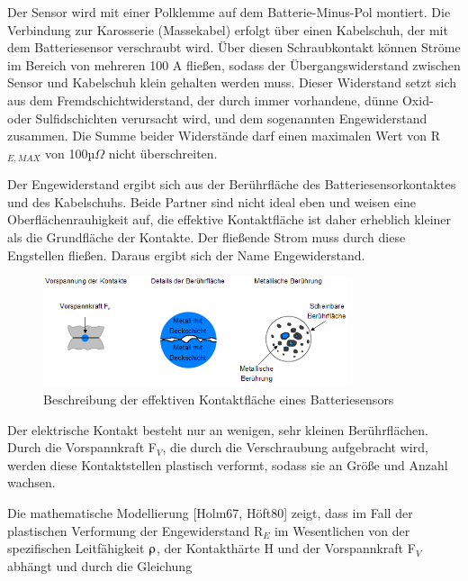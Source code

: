 \noindent Der Sensor wird mit einer Polklemme auf dem Batterie-Minus-Pol montiert. Die Verbindung zur Karosserie (Massekabel) erfolgt \"{u}ber einen Kabelschuh, der mit dem Batteriesensor verschraubt wird. \"{U}ber diesen Schraubkontakt k\"{o}nnen Str\"{o}me im Bereich von mehreren 100 A flie{\ss}en, sodass der \"{U}bergangswiderstand zwischen Sensor und Kabelschuh klein gehalten werden muss. Dieser Widerstand setzt sich aus dem Fremdschichtwiderstand, der durch immer vorhandene, d\"{u}nne Oxid- oder Sulfidschichten verursacht wird, und dem sogenannten Engewiderstand zusammen. Die Summe beider Widerst\"{a}nde darf einen maximalen Wert von R$_{E,MAX}$ von 100µ$\Omega$ nicht \"{u}berschreiten.\newline

\noindent Der Engewiderstand ergibt sich aus der Ber\"{u}hrfl\"{a}che des Batteriesensorkontaktes und des Kabelschuhs. Beide Partner sind nicht ideal eben und weisen eine Oberfl\"{a}chenrauhigkeit auf, die effektive Kontaktfl\"{a}che ist daher erheblich kleiner als die Grundfl\"{a}che der Kontakte. Der flie{\ss}ende Strom muss durch diese Engstellen flie{\ss}en. Daraus ergibt sich der Name Engewiderstand.

\noindent 
\begin{figure}[H]
  \centerline{\includegraphics[width=0.8\textwidth]{Kapitel5/Bilder/image10}}
  \caption{Beschreibung der effektiven Kontaktfl\"{a}che eines Batteriesensors}
  \label{fig:Batteriewiderstand2}
\end{figure}

\noindent Der elektrische Kontakt besteht nur an wenigen, sehr kleinen Ber\"{u}hrfl\"{a}chen. Durch die Vorspannkraft F$_{V}$, die durch die Verschraubung aufgebracht wird, werden diese Kontaktstellen plastisch verformt, sodass sie an Gr\"{o}{\ss}e und Anzahl wachsen.\newline

\noindent Die mathematische Modellierung [Holm67, H\"{o}ft80] zeigt, dass im Fall der plastischen Verformung der Engewiderstand R$_{E}$ im Wesentlichen von der spezifischen Leitf\"{a}higkeit $\rhoup$, der Kontakth\"{a}rte H und der Vorspannkraft F$_{V}$ abh\"{a}ngt und durch die Gleichung


